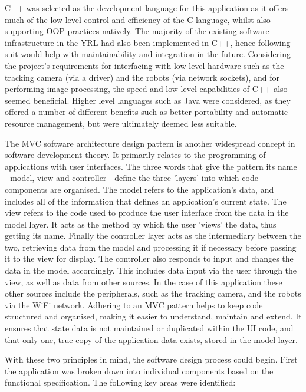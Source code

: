 C++ was selected as the development language for this application as it offers much of the low level control and efficiency of the C language, whilst also supporting OOP practices natively. The majority of the existing software infrastructure in the YRL had also been implemented in C++, hence following suit would help with maintainability and integration in the future. Considering the project's requirements for interfacing with low level hardware such as the tracking camera (via a driver) and the robots (via network sockets), and for performing image processing, the speed and low level capabilities of C++ also seemed beneficial. Higher level languages such as Java were considered, as they offered a number of different benefits such as better portability and automatic resource management, but were ultimately deemed less suitable.

The MVC software architecture design pattern is another widespread concept in software development theory. It primarily relates to the programming of applications with user interfaces. The three words that give the pattern its name - model, view and controller - define the three 'layers' into which code components are organised. The model refers to the application's data, and includes all of the information that defines an application's current state. The view refers to the code used to produce the user interface from the data in the model layer. It acts as the method by which the user 'views' the data, thus getting its name. Finally the controller layer acts as the intermediary between the two, retrieving data from the model and processing it if necessary before passing it to the view for display. The controller also responds to input and changes the data in the model accordingly. This includes data input via the user through the view, as well as data from other sources. In the case of this application these other sources include the peripherals, such as the tracking camera, and the robots via the WiFi network. Adhering to an MVC pattern helps to keep code structured and organised, making it easier to understand, maintain and extend. It ensures that state data is not maintained or duplicated within the UI code, and that only one, true copy of the application data exists, stored in the model layer.

With these two principles in mind, the software design process could begin. First the application was broken down into individual components based on the functional specification. The following key areas were identified:

